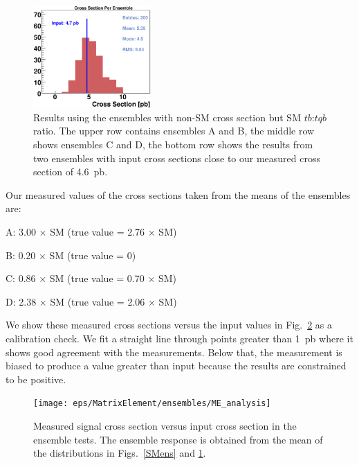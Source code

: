 \begin{figure}[!h!tbp]
\includegraphics[width=0.40\textwidth]{eps/MatrixElement/ensembles/Ensembles4.7.eps}
\vspace{-0.1in}
\caption{Results using the ensembles with non-SM cross section but
SM $tb$:$tqb$ ratio. The upper row contains ensembles A and B, the
middle row shows ensembles C and D, the bottom row shows the results
from two ensembles with input cross sections close to our measured
cross section of 4.6~pb.}
\label{ensembles}
\end{figure}

Our measured values of the cross sections taken from the means of the
ensembles are:
\vspace{-0.05in}
\begin{myitemize}
\item A: 3.00 $\times$ SM \hspace{0.2in}(true value = 2.76 $\times$ SM)
\item B: 0.20 $\times$ SM \hspace{0.2in}(true value = 0)
\item C: 0.86 $\times$ SM \hspace{0.2in}(true value = 0.70 $\times$ SM)
\item D: 2.38 $\times$ SM \hspace{0.2in}(true value = 2.06 $\times$ SM)
\end{myitemize} 

We show these measured cross sections versus the input values in
Fig.~\ref{calibration} as a calibration check. We fit a straight line
through points greater than 1~pb where it shows good agreement with
the measurements. Below that, the measurement is biased to produce a
value greater than input because the results are constrained to be
positive.

\clearpage

\vspace{0.1in}
\begin{figure}[!h!tbp]
\begin{center}
\texttt{[image: eps/MatrixElement/ensembles/ME\_analysis]}
\end{center}
\vspace{-0.1in}
\caption[calibration]{Measured signal cross section versus input
cross section in the ensemble tests. The ensemble response is obtained
from the mean of the distributions in Figs.~\ref{SMens} and
\ref{ensembles}.}
\label{calibration}
\end{figure}



